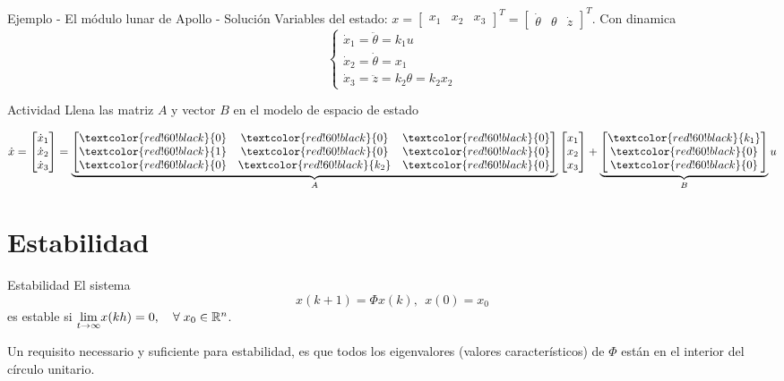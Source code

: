 \documentclass[presentation,aspectratio=1610]{beamer}
\begin{document}
\begin{frame}[label={sec:org14297db}]{Ejemplo - El módulo lunar de Apollo - Solución}
Variables del estado: \(x = \begin{bmatrix} x_1 & x_2 & x_3 \end{bmatrix}^T = \begin{bmatrix} \dot{\theta} & \theta & \dot{z} \end{bmatrix}^T\). Con dinamica
\[ \begin{cases} \dot{x}_1 =  \ddot{\theta} = k_1 u\\ \dot{x}_2 = \dot{\theta} = x_1\\ \dot{x}_3 = \ddot{z} = k_2\theta = k_2x_2 \end{cases} \]

\alert{Actividad} Llena las matriz \(A\) y vector \(B\) en el modelo de espacio de estado

\[ \dot{x} = \begin{bmatrix} \dot{x}_1\\\dot{x}_2\\\dot{x}_3\end{bmatrix} = \underbrace{\begin{bmatrix} \textcolor{red!60!black}{0} & \textcolor{red!60!black}{0} &\textcolor{red!60!black}{0} \\\textcolor{red!60!black}{1} & \textcolor{red!60!black}{0}& \textcolor{red!60!black}{0}\\ \textcolor{red!60!black}{0}& \textcolor{red!60!black}{k_2} &\textcolor{red!60!black}{0} \end{bmatrix}}_{A} \begin{bmatrix} x_1\\x_2\\x_3\end{bmatrix} + \underbrace{\begin{bmatrix} \textcolor{red!60!black}{k_1} \\ \textcolor{red!60!black}{0} \\\textcolor{red!60!black}{0}  \end{bmatrix}}_{B} u \]
\end{frame}



\section{Estabilidad}
\label{sec:org15b6b74}
\begin{frame}[label={sec:org5887aeb}]{Estabilidad}
El sistema
\begin{equation*}
x(k+1)=\Phi x(k), \ \ x(0)=x_0
\end{equation*}
es \alert{estable} si  \(\underset{t\to\infty}{\lim}x(kh)=0, \quad \forall\;  x_0\in\Bbb{R}^n\).

Un requisito necessario y suficiente para estabilidad, es que \alert{todos los eigenvalores (valores característicos) de \(\Phi\) están en el interior del círculo unitario.}
\end{frame}
\end{document}
